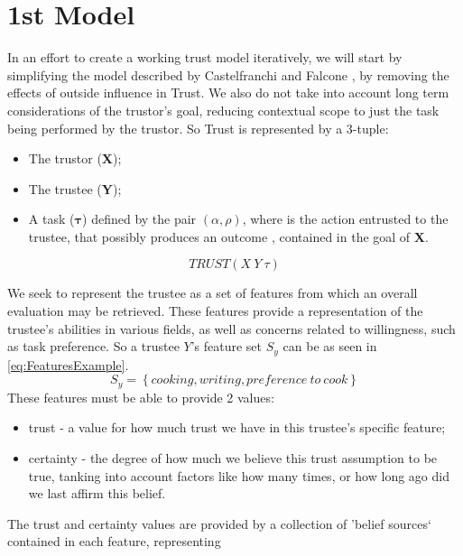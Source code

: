 \section{1st Model}
\label{sec:Model}

In an effort to create a working trust model iteratively, we will start by simplifying the model described by Castelfranchi and Falcone \cite{Castelfranchi1998}, by removing the effects of outside influence in Trust. We also do not take into account long term considerations of the trustor's goal, reducing contextual scope to just the task being performed by the trustor. So Trust is represented by a 3-tuple:

\begin{itemize}
	\item The trustor (\textbf{X});
	\item The trustee (\textbf{Y});
	\item A task ($\bm{\tau}$) defined by the pair $(\alpha, \rho)$, where \bm{$\alpha$} is the action entrusted to the trustee, that possibly produces an outcome \bm{$\rho$}, contained in the goal of \textbf{X}.
\end{itemize}
\begin{equation}
TRUST(X\ Y\ \tau)
\label{eq:TrustRelation}
\end{equation}

We seek to represent the trustee as a set of features from which an overall evaluation may be retrieved. These features provide a representation of the trustee's abilities in various fields, as well as concerns related to willingness, such as task preference. So a trustee $Y$'s feature set $ S_y $ can be as seen in \ref{eq:FeaturesExample}.
\begin{equation}
S_y=\left\{cooking, writing, preference\ to\ cook\right\}
\label{eq:FeaturesExample}
\end{equation}
These features must be able to provide 2 values:

\begin{itemize}
	\item trust - a value for how much trust we have in this trustee's specific feature;
	\item certainty - the degree of how much we believe this trust assumption to be true, tanking into account factors like how many times, or how long ago did we last affirm this belief.
\end{itemize}

The trust and certainty values are provided by a collection of 'belief sources` contained in each feature, representing 

